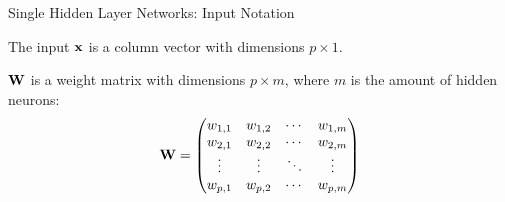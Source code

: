 \documentclass[11pt,compress,t,notes=noshow, xcolor=table]{beamer}
\begin{document}


%
%

\begin{framei}[sep=L]{Single Hidden Layer Networks: Input Notation}

\item The input $\mathbf{x}$ is a column vector with dimensions $p \times 1$. 
\item $\mathbf{W}$ is a weight matrix with dimensions $p \times m$, where $m$ is the amount of hidden neurons:
$$\mathbf{W} =
     \begin{pmatrix}
      w_{1,1} & w_{1,2} & \cdots & w_{1,m} \\
      w_{2,1} & w_{2,2} & \cdots & w_{2,m} \\
      \vdots  & \vdots  & \ddots & \vdots  \\
      w_{p,1} & w_{p,2} & \cdots & w_{p,m}
     \end{pmatrix}$$
     
     \end{framei}
     
\end{document}

